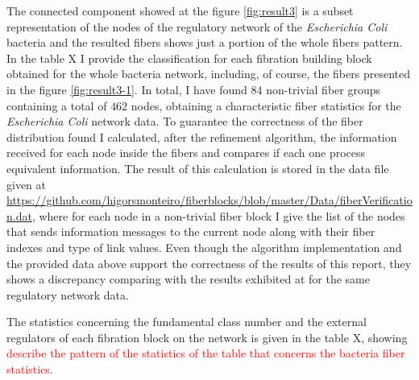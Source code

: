 \documentclass[12pt]{diazessay} %
\begin{document}
The connected component showed at the figure \ref{fig:result3} is a subset representation of the nodes of the regulatory network of the \textit{Escherichia Coli} bacteria and the resulted fibers shows just a portion of the whole fibers pattern. In the table X I provide the classification for each fibration building block obtained for the whole bacteria network, including, of course, the fibers presented in the figure \ref{fig:result3-1}. In total, I have found $84$ non-trivial fiber groups containing a total of $462$ nodes, obtaining a characteristic fiber statistics for the \textit{Escherichia Coli} network data. To guarantee the correctness of the fiber distribution found I calculated, after the refinement algorithm, the information received for each node inside the fibers and compares if each one process equivalent information. The result of this calculation is stored in the data file given at \url{https://github.com/higorsmonteiro/fiberblocks/blob/master/Data/fiberVerification.dat}, where for each node in a non-trivial fiber block I give the list of the nodes that sends information messages to the current node along with their fiber indexes and type of link values. Even though the algorithm implementation and the provided data above support the correctness of the results of this report, they shows a discrepancy comparing with the results exhibited at \cite{fibration2019} for the same regulatory network data.

The statistics concerning the fundamental class number and the external regulators of each fibration block on the network is given in the table X, showing \textcolor{red}{describe the pattern of the statistics of the table that concerns the bacteria fiber statistics}.







\end{document}
